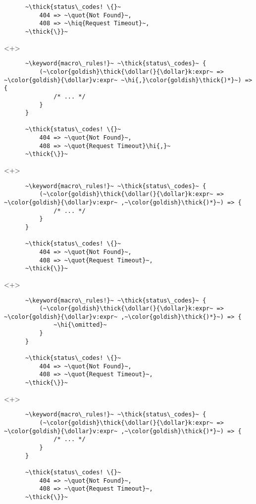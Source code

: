 \documentclass[usepdftitle=false,aspectratio=169]{beamer}
\newcommand{\dollar}{\makebox[\widthof{\$}][c]{\$}}
\newcommand{\thick}[1]{\contourlength{0.16pt}\contour[10]{black}{#1}}
\newcommand{\slantbox}[2][.5]
  {%
    \mbox
      {%
        \sbox{\foobox}{#2}%
        \hskip\wd\foobox
        \pdfsave
        \pdfsetmatrix{1 0 #1 1}%
        \llap{\usebox{\foobox}}%
        \pdfrestore
      }%
  }
\newcommand{\backslantbox}[2][.5]
  {%
    \mbox
      {%
        \sbox{\foobox}{#2}%
        \hskip\wd\foobox
        \pdfsave
        \pdfsetmatrix{-1 0 #1 1}%
        \llap{\usebox{\foobox}}%
        \pdfrestore
      }%
  }
\newcommand{\hi}[1]{%
\tikz[baseline=(A.base)]
 \node[highlighting=yellowbg,inner sep=0pt,text depth=0pt] (A) {#1};%
}
\newcommand{\openquote}{\backslantbox[.2]{\hspace{11pt}''\hspace{-11pt}}}
\newcommand{\closequote}{\slantbox[-.2]{\hspace{2pt}''\hspace{-2pt}}}
\newcommand{\hiq}[1]{\hi{\openquote#1\closequote}}
\newcommand{\blackquote}[1]{\openquote#1\closequote}
\newcommand{\quot}[1]{{\color{redish}\blackquote{#1}}}
\newcommand{\keyword}[1]{\color{greenish}#1}
\newcommand{\omitted}{/* ... */}
\begin{document}
\begin{frame}[fragile]
\begin{onlyenv}
\begin{verbatim}
      ~\thick{status\_codes! \{}~
          404 => ~\quot{Not Found}~,
          408 => ~\hiq{Request Timeout}~,
      ~\thick{\}}~
    \end{verbatim}
  \end{onlyenv}
  \begin{onlyenv}<+>
    \begin{verbatim}
      ~\keyword{macro\_rules!}~ ~\thick{status\_codes}~ {
          (~\color{goldish}\thick{\dollar(}{\dollar}k:expr~ => ~\color{goldish}{\dollar}v:expr~ ~\hi{,}\color{goldish}\thick{)*}~) => {
              /* ... */
          }
      }

      ~\thick{status\_codes! \{}~
          404 => ~\quot{Not Found}~,
          408 => ~\quot{Request Timeout}\hi{,}~
      ~\thick{\}}~
    \end{verbatim}
  \end{onlyenv}
  \begin{onlyenv}<+>
    \begin{verbatim}
      ~\keyword{macro\_rules!}~ ~\thick{status\_codes}~ {
          (~\color{goldish}\thick{\dollar(}{\dollar}k:expr~ => ~\color{goldish}{\dollar}v:expr~ ,~\color{goldish}\thick{)*}~) => {
              /* ... */
          }
      }

      ~\thick{status\_codes! \{}~
          404 => ~\quot{Not Found}~,
          408 => ~\quot{Request Timeout}~,
      ~\thick{\}}~
    \end{verbatim}
  \end{onlyenv}
  \begin{onlyenv}<+>
    \begin{verbatim}
      ~\keyword{macro\_rules!}~ ~\thick{status\_codes}~ {
          (~\color{goldish}\thick{\dollar(}{\dollar}k:expr~ => ~\color{goldish}{\dollar}v:expr~ ,~\color{goldish}\thick{)*}~) => {
              ~\hi{\omitted}~
          }
      }

      ~\thick{status\_codes! \{}~
          404 => ~\quot{Not Found}~,
          408 => ~\quot{Request Timeout}~,
      ~\thick{\}}~
    \end{verbatim}
  \end{onlyenv}
  \begin{onlyenv}<+>
    \begin{verbatim}
      ~\keyword{macro\_rules!}~ ~\thick{status\_codes}~ {
          (~\color{goldish}\thick{\dollar(}{\dollar}k:expr~ => ~\color{goldish}{\dollar}v:expr~ ,~\color{goldish}\thick{)*}~) => {
              /* ... */
          }
      }

      ~\thick{status\_codes! \{}~
          404 => ~\quot{Not Found}~,
          408 => ~\quot{Request Timeout}~,
      ~\thick{\}}~
    \end{verbatim}
  \end{onlyenv}
\end{frame}
\end{document}
